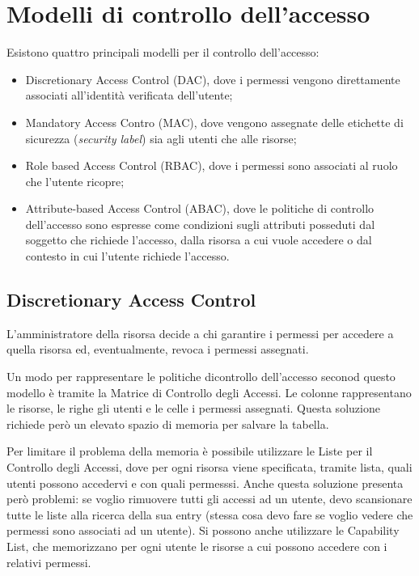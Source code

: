 \section{Modelli di controllo dell'accesso}
\noindent Esistono quattro principali modelli per il controllo dell'accesso:
\begin{itemize}
    \item Discretionary Access Control (DAC), dove i permessi vengono direttamente associati all'identità verificata dell'utente;
    \item Mandatory Access Contro (MAC), dove vengono assegnate delle etichette di sicurezza (\textit{security label}) sia agli utenti che alle risorse;
    \item Role based Access Control (RBAC), dove i permessi sono associati al ruolo che l'utente ricopre;
    \item Attribute-based Access Control (ABAC), dove le politiche di controllo dell'accesso sono espresse come condizioni sugli attributi posseduti dal soggetto che richiede l'accesso, dalla risorsa a cui vuole accedere o dal contesto in cui l'utente richiede l'accesso.
\end{itemize}

\subsection{Discretionary Access Control}
L'amministratore della risorsa decide a chi garantire i permessi per accedere a quella risorsa ed, eventualmente, revoca i permessi assegnati.

Un modo per rappresentare le politiche dicontrollo dell'accesso seconod questo modello è tramite la Matrice di Controllo degli Accessi. Le colonne rappresentano le risorse, le righe gli utenti e le celle i permessi assegnati. Questa soluzione richiede però un elevato spazio di memoria per salvare la tabella.

Per limitare il problema della memoria è possibile utilizzare le Liste per il Controllo degli Accessi, dove per ogni risorsa viene specificata, tramite lista, quali utenti possono accedervi e con quali permesssi. Anche questa soluzione presenta però problemi: se voglio rimuovere tutti gli accessi ad un utente, devo scansionare tutte le liste alla ricerca della sua entry (stessa cosa devo fare se voglio vedere che permessi sono associati ad un utente).
Si possono anche utilizzare le Capability List, che memorizzano per ogni utente le risorse a cui possono accedere con i relativi permessi.

